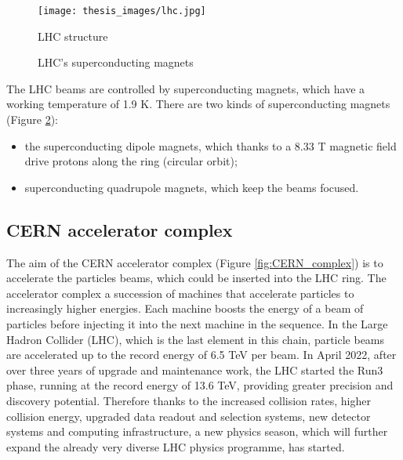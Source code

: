 \documentclass[a4paper, oneside, 11pt, openright]{book}
\begin{document}
				\begin{figure}[H]
					\centering
					\texttt{[image: thesis\_images/lhc.jpg]}
					\caption{LHC structure}
					\label{fig:LHC_layout}
				\end{figure}
				
				\begin{figure}[H]
					\centering
					 \quad
					\caption{LHC's superconducting magnets}
					\label{fig:magnets}
				\end{figure}
				
				The LHC beams are controlled by superconducting magnets, which have a working temperature of 1.9 K. There are two kinds of superconducting magnets (Figure \ref{fig:magnets}):
				\begin{itemize}
					\item the superconducting dipole magnets, which thanks to a 8.33 T magnetic field drive protons along the ring (circular orbit);
					\item superconducting quadrupole magnets, which keep the beams focused.
				\end{itemize} 
					
			\subsection{CERN accelerator complex}
				The aim of the CERN accelerator complex (Figure \ref{fig:CERN_complex}) is to accelerate the particles beams, which could be inserted into the LHC ring. The accelerator complex a succession of machines that accelerate particles to increasingly higher energies. Each machine boosts the energy of a beam of particles before injecting it into the next machine in the sequence. In the Large Hadron Collider (LHC), which is the last element in this chain, particle beams are accelerated up to the record energy of 6.5 TeV per beam. In April 2022, after over three years of upgrade and maintenance work, the LHC started the Run3 phase, running at the record energy of 13.6 TeV, providing greater precision and discovery potential. Therefore thanks to the increased collision rates, higher collision energy, upgraded data readout and selection systems, new detector systems and computing infrastructure, a new physics season, which will further expand the already very diverse LHC physics programme, has started.
				
\end{document}
